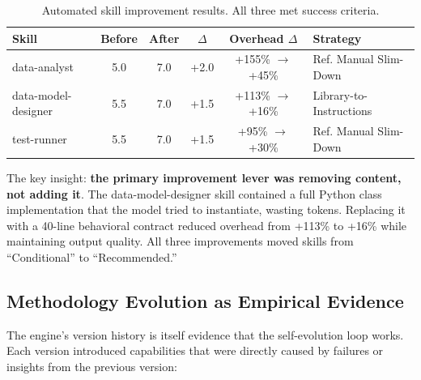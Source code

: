 \documentclass[11pt,a4paper]{article}
\begin{document}
\begin{table}[h]
\centering
\caption{Automated skill improvement results. All three met success criteria.}
\label{tab:improvement}
\begin{tabular}{lccccl}
\toprule
\textbf{Skill} & \textbf{Before} & \textbf{After} & \textbf{$\Delta$} & \textbf{Overhead $\Delta$} & \textbf{Strategy} \\
\midrule
data-analyst & 5.0 & 7.0 & +2.0 & +155\% $\rightarrow$ +45\% & Ref. Manual Slim-Down \\
data-model-designer & 5.5 & 7.0 & +1.5 & +113\% $\rightarrow$ +16\% & Library-to-Instructions \\
test-runner & 5.5 & 7.0 & +1.5 & +95\% $\rightarrow$ +30\% & Ref. Manual Slim-Down \\
\bottomrule
\end{tabular}
\end{table}

The key insight: \textbf{the primary improvement lever was removing content, not adding it}. The data-model-designer skill contained a full Python class implementation that the model tried to instantiate, wasting tokens. Replacing it with a 40-line behavioral contract reduced overhead from +113\% to +16\% while maintaining output quality. All three improvements moved skills from ``Conditional'' to ``Recommended.''

\subsection{Methodology Evolution as Empirical Evidence}

The engine's version history is itself evidence that the self-evolution loop works. Each version introduced capabilities that were directly caused by failures or insights from the previous version:
\end{document}
